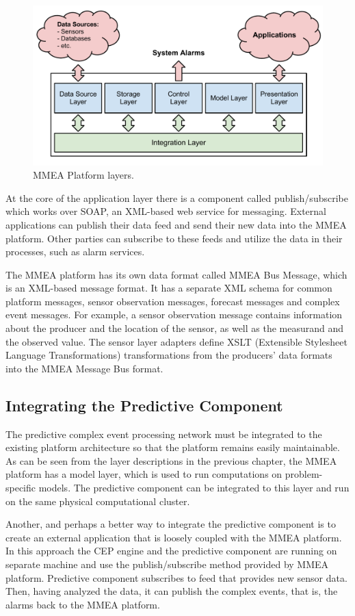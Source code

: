 \begin{figure}[here]
\centering
\includegraphics[scale=0.7]{images/mmea.pdf}
\caption{MMEA Platform layers.}
\label{fig:mmea}
\end{figure}

At the core of the application layer there is a component called publish/subscribe which works over SOAP, an XML-based web service for messaging. External applications can publish their data feed and send their new data into the MMEA platform. Other parties can subscribe to these feeds and utilize the data in their processes, such as alarm services.

The MMEA platform has its own data format called MMEA Bus Message, which is an XML-based message format. It has a separate XML schema for common platform messages, sensor observation messages, forecast messages and complex event messages. For example, a sensor observation message contains information about the producer and the location of the sensor, as well as the measurand and the observed value. The sensor layer adapters define XSLT (Extensible Stylesheet Language Transformations) transformations from the producers' data formats into the MMEA Message Bus format.



\subsection{Integrating the Predictive Component}
The predictive complex event processing network must be integrated to the existing platform architecture so that the platform remains easily maintainable. As can be seen from the layer descriptions in the previous chapter, the MMEA platform has a model layer, which is used to run computations on problem-specific models. The predictive component can be integrated to this layer and run on the same physical computational cluster.

Another, and perhaps a better way to integrate the predictive component is to create an external application that is loosely coupled with the MMEA platform. In this approach the CEP engine and the predictive component are running on separate machine and use the publish/subscribe method provided by MMEA platform. Predictive component subscribes to feed that provides new sensor data. Then, having analyzed the data, it can publish the complex events, that is, the alarms back to the MMEA platform.




